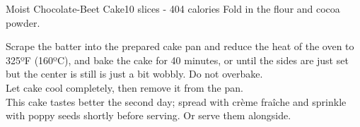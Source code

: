 \begin{recipe}{Moist Chocolate-Beet Cake}{10 slices - 404 calories}{}
Fold in the flour and cocoa powder.\newpage

Scrape the batter into the prepared cake pan and reduce the heat of the oven to 325ºF (160ºC), and bake the cake for 40 minutes, or until the sides are just set but the center is still is just a bit wobbly. Do not overbake.\\

Let cake cool completely, then remove it from the pan.\\

This cake tastes better the second day; spread with crème fraîche and sprinkle with poppy seeds shortly before serving. Or serve them alongside.

\end{recipe}